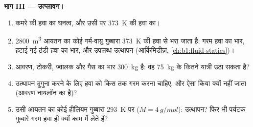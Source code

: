 \begin{problem}
\medskip
\noindent\textbf{भाग III --- उत्प्लावन।}
\begin{enumerate}[resume]
  \item कमरे की हवा का घनत्व, और उसी  पर \qty{373}{K} की हवा का।
  \item \qty{2800}{m^3} आयतन का कोई गर्म-वायु गुब्बारा \qty{373}{K} की
        हवा से भरा जाता है: गरम हवा का भार, हटाई गई ठंडी हवा का भार, और
        उपलब्ध उत्थापन (आर्किमिडीज़,
        \cref{ch:b1:fluid-statics})।
  \item आवरण, टोकरी, ज्वालक और गैस का भार \qty{300}{kg} है: वह
        \qty{75}{kg} के कितने यात्री उठा सकता है?
  \item उत्थापन दुगुना करने के लिए हवा को किस  तक गरम करना चाहिए, और
        ऐसा किया क्यों नहीं जाता (आवरण नायलॉन का है)?
  \item उसी आयतन का कोई हीलियम गुब्बारा \qty{293}{K} पर
        ($M = \qty{4}{g/mol}$): उत्थापन? फिर भी पर्यटक गुब्बारे गरम हवा ही
        क्यों काम में लेते हैं?
\end{enumerate}


\end{problem}
